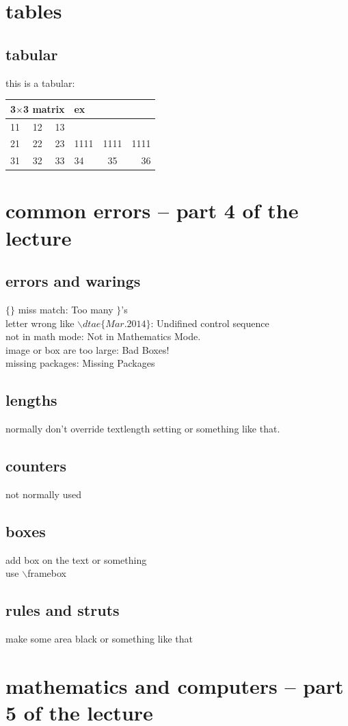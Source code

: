 \documentclass[11pt,a4paper]{article}
\begin{document}
\section{tables}{
  \subsection{tabular}
  this is a tabular: \\
  \begin{tabular}{||lcr|lcr}
    \hline
    \multicolumn{3}{c|}{3$\times$3 matrix} & ex\\
    \hline
    11 & 12 & 13 \\ %
    \hline
    21 & 22 & 23 &1111&1111&1111\\
    \cline{1-2}\cline{4-5}
    31 & 32 & 33 & 34 & 35 & 36
  \end{tabular}
}

\section{common errors -- part 4 of the lecture}{
  


  \subsection{errors and warings}{
    $\{\}$ miss match: Too many $\}$'s \\
    letter wrong like $\backslash dtae\{Mar.2014\}$: Undifined control sequence\\
    not in math mode: Not in Mathematics Mode. \\
    image or box are too large: Bad Boxes! \\
    missing packages: Missing Packages \\
  }
  
  \subsection{lengths}{
    normally don't override textlength setting or something like that.
  }
  \subsection{counters}{not normally used}
  \subsection{boxes}{
    add box on the text or \framebox something \\
    use $\backslash$framebox
  }
  \subsection{rules and struts}{
    make some area black or something like that
  }
}


\section{mathematics and computers -- part 5 of the lecture}{
  
}
\end{document}
